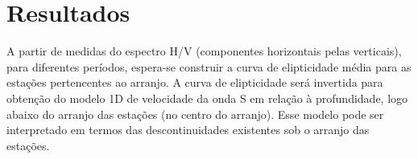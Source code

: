\documentclass[smallextended]{svjour3}       %
\begin{document}


\section{Resultados}
\label{results}

A partir de medidas do espectro H/V (componentes horizontais pelas verticais), para diferentes
períodos, espera-se construir a curva de elipticidade média para as estações pertencentes ao arranjo. A curva
de elipticidade será invertida para obtenção do modelo 1D de velocidade da onda S em relação à profundidade, logo abaixo do arranjo das estações (no centro do arranjo). Esse modelo pode ser interpretado em termos das descontinuidades existentes sob o arranjo das estações.

\end{document}
